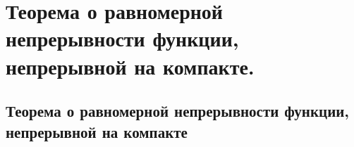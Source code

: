 \chapter{Теорема о равномерной непрерывности функции, непрерывной на компакте.}
\section{Теорема о равномерной непрерывности функции, непрерывной на компакте}